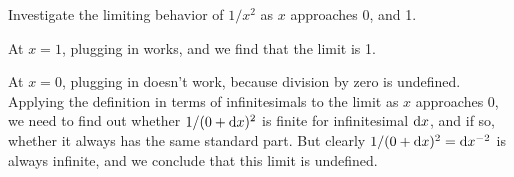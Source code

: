 

\begin{eg}\label{eg:no-limit}
\egquestion Investigate the limiting behavior of $1/x^2$ as $x$ approaches 0, and 1.

\eganswer At $x=1$, plugging in works, and we find that the limit is 1.

At $x=0$, plugging in doesn't work, because division by zero is undefined.
Applying the definition in terms of infinitesimals to the limit as $x$ approaches 0, we need to find
out whether $1/(0+\textup{d} x)^2$ is finite for infinitesimal $\textup{d} x$, and if so, whether it always has the same standard
part. But clearly $1/(0+\textup{d} x)^2=\textup{d} x^{-2}$ is always infinite, and we conclude that this limit is undefined.
\end{eg}



